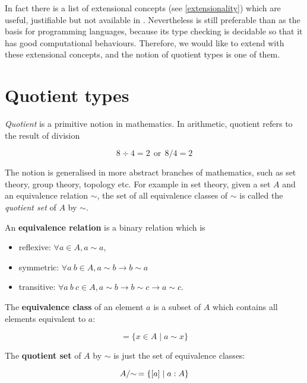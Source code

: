 
In fact there is a list of extensional concepts (see \autoref{extensionality}) which are useful, justifiable but not available in \itt.
Nevertheless \itt is still preferable than \ett as the basis for programming languages, because its type checking is decidable so that it has good computational behaviours.
Therefore, we would like to extend \itt with these extensional concepts, and the notion of quotient types is one of them.



\section{Quotient types}


\emph{Quotient} is a primitive notion in mathematics. In arithmetic, quotient refers to the result of division

$$8 \div 4 = 2 ~~ \text{or}~~ 8/4 = 2$$

The notion is generalised in more abstract branches of mathematics, such as set theory, group theory, topology etc. For example in set theory, given a set $A$ and an equivalence relation $\sim$, the set of all equivalence classes of $\sim$ is called the \emph{quotient set} of $A$ by $\sim$.

An \textbf{equivalence relation} is a binary relation which is 

\begin{itemize}
\item reflexive: $\forall a \in A, a \sim a$,
\item symmetric: $\forall a~ b \in A, a \sim b \to b \sim a$
\item transitive: $\forall a ~ b~ c \in A, a \sim b \to b \sim c \to a \sim c$.
\end{itemize}

The \textbf{equivalence class} of an element $a$ is a subset of $A$ which contains all elements equivalent to $a$:

\begin{equation*}
[a] = \{x \in A \;| \; a \sim x \}
\end{equation*}

The \textbf{quotient set} of $A$ by $\sim$ is just the set of equivalence classes:

\begin{equation*}
\qset{A} = \{ [ a ] \;|\; a : A \}
\end{equation*}

